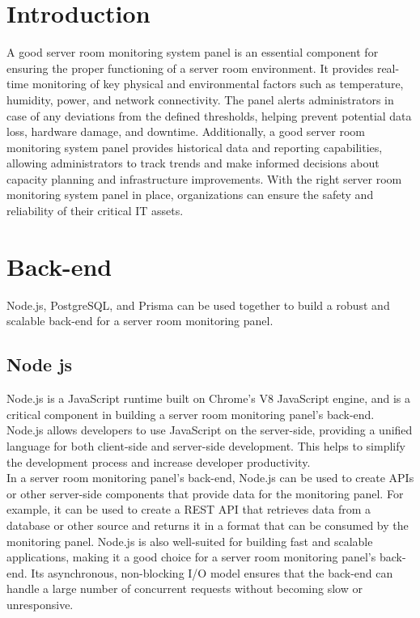 \section{Introduction}
A good server room monitoring system panel is an essential component for ensuring the proper functioning of a server room environment. It provides real-time monitoring of key physical and environmental factors such as temperature, humidity, power, and network connectivity. The panel alerts administrators in case of any deviations from the defined thresholds, helping prevent potential data loss, hardware damage, and downtime. Additionally, a good server room monitoring system panel provides historical data and reporting capabilities, allowing administrators to track trends and make informed decisions about capacity planning and infrastructure improvements. With the right server room monitoring system panel in place, organizations can ensure the safety and reliability of their critical IT assets.
\section{Back-end}
Node.js, PostgreSQL, and Prisma can be used together to build a robust and scalable back-end for a server room monitoring panel.
    \subsection{Node js} 
    Node.js is a JavaScript runtime built on Chrome's V8 JavaScript engine, and is a critical component in building a server room monitoring panel's back-end. Node.js allows developers to use JavaScript on the server-side, providing a unified language for both client-side and server-side development. This helps to simplify the development process and increase developer productivity.\\
    In a server room monitoring panel's back-end, Node.js can be used to create APIs or other server-side components that provide data for the monitoring panel. For example, it can be used to create a REST API that retrieves data from a database or other source and returns it in a format that can be consumed by the monitoring panel. Node.js is also well-suited for building fast and scalable applications, making it a good choice for a server room monitoring panel's back-end. Its asynchronous, non-blocking I/O model ensures that the back-end can handle a large number of concurrent requests without becoming slow or unresponsive. \cite{nodejs}

